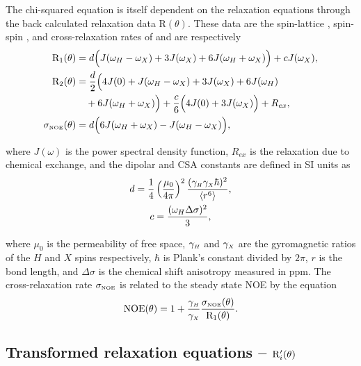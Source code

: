 The chi-squared equation is itself dependent on the relaxation equations through the back calculated relaxation data R$(\theta)$.  These data are the spin-lattice  , spin-spin , and cross-relaxation rates of \citet{Abragam61} and are respectively
\begin{align}
 \mathrm{R}_1(\theta) &= d \Big( J(\omega_H - \omega_X) + 3J(\omega_X) + 6J(\omega_H + \omega_X) \Big) + cJ(\omega_X),   \\  \label{eq: R1}
 \mathrm{R}_2(\theta) &= \frac{d}{2} \Big( 4J(0) + J(\omega_H - \omega_X) + 3J(\omega_X) + 6J(\omega_H)                  \nonumber \\
     &  \quad + 6J(\omega_H + \omega_X) \Big) + \frac{c}{6} \Big( 4J(0) + 3J(\omega_X) \Big) + R_{ex},  \\  \label{eq: R2}
 \sigma_{\scriptscriptstyle \mathrm{NOE}}(\theta) &= d \Big( 6J(\omega_H + \omega_X) - J(\omega_H - \omega_X) \Big),                          \\  \label{eq: sigma_NOE}
\end{align}

\noindent where $J(\omega)$ is the power spectral density function, $R_{ex}$ is the relaxation due to chemical exchange, and the dipolar and CSA constants are defined in SI units as
\begin{gather}
 d = \frac{1}{4} \left(\frac{\mu_0}{4\pi}\right)^2 \frac{(\gamma_{\scriptscriptstyle H} \gamma_{\scriptscriptstyle X} \hbar)^2}{\langle r^6 \rangle}, \label{eq: dipolar constant} \\
 c = \frac{(\omega_H \Delta\sigma)^2}{3}, \label{eq: CSA constant}
\end{gather}

\noindent where $\mu_0$ is the permeability of free space, $\gamma_{\scriptscriptstyle H}$ and $\gamma_{\scriptscriptstyle X}$ are the gyromagnetic ratios of the $H$ and $X$ spins respectively, $\hbar$ is Plank's constant divided by $2\pi$, $r$ is the bond length, and $\Delta\sigma$ is the chemical shift anisotropy measured in ppm.  The cross-relaxation rate $\sigma_{\scriptscriptstyle \mathrm{NOE}}$  is related to the steady state NOE by the equation
\begin{equation} \label{eq: NOE}
 \mathrm{NOE}(\theta) = 1 + \frac{\gamma_{\scriptscriptstyle H}}{\gamma_{\scriptscriptstyle X}} \frac{\sigma_{\scriptscriptstyle \mathrm{NOE}}(\theta)}{\mathrm{R}_1(\theta)}.
\end{equation}


\subsection{Transformed relaxation equations -- $\mathrm{R}_i'(\theta)$}


